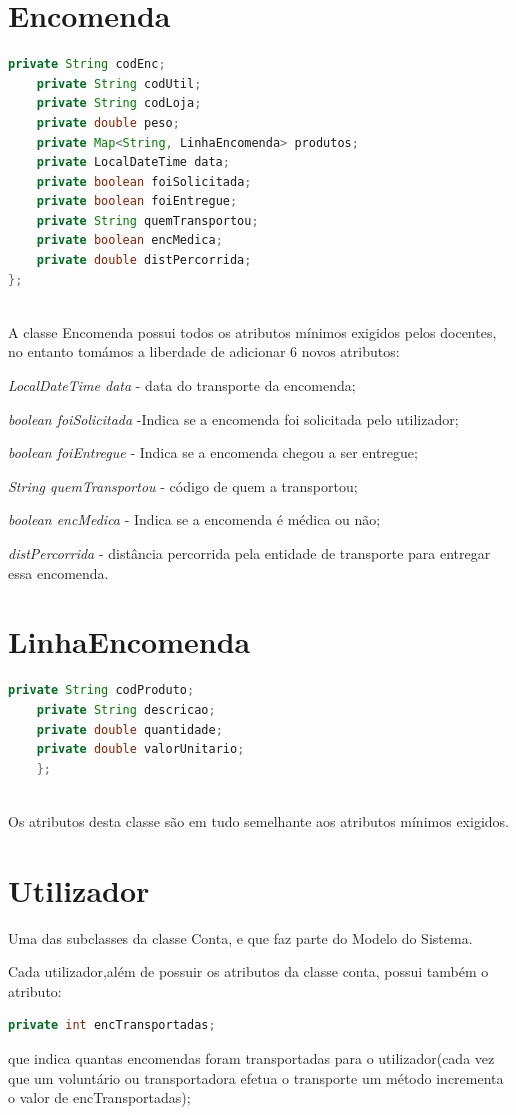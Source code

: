 \documentclass[a4paper]{report}
\begin{document}
	
	
	\section{Encomenda}
	\begin{lstlisting}[language=Java]
	private String codEnc;
	private String codUtil;
	private String codLoja;
	private double peso;
	private Map<String, LinhaEncomenda> produtos;
	private LocalDateTime data;
	private boolean foiSolicitada;
	private boolean foiEntregue;
	private String quemTransportou;
	private boolean encMedica;
	private double distPercorrida;
};
   
	\end{lstlisting}
	A classe Encomenda possui todos os atributos mínimos exigidos pelos docentes, no entanto tomámos a liberdade de adicionar 6 novos atributos:
	
	  \textit{LocalDateTime data} - data do transporte da encomenda;
	  	
	  \textit{boolean foiSolicitada} -Indica se a encomenda foi solicitada pelo utilizador;
	  
	  \textit{boolean foiEntregue}  - Indica se a encomenda chegou a ser entregue;
	  
	  \textit{String quemTransportou} - código de quem a transportou;
	  
	  \textit{boolean encMedica} - Indica se a encomenda é médica ou não;
	  
	  \textit{distPercorrida} - distância percorrida pela entidade de transporte para entregar essa encomenda.
	  
	
		\section{LinhaEncomenda}
	\begin{lstlisting}[language=Java]
	private String codProduto;
	private String descricao;
	private double quantidade;
	private double valorUnitario;
	};
	
	\end{lstlisting}
		Os atributos desta classe são em tudo semelhante aos atributos mínimos exigidos.
		
	\section{Utilizador}
	Uma das subclasses da classe Conta, e que faz parte do Modelo do Sistema.	
	
	Cada utilizador,além de possuir os atributos da classe conta, possui também o atributo:
	\begin{lstlisting}[language=Java]
	private int encTransportadas;
	\end{lstlisting}
	que indica quantas encomendas foram transportadas para o utilizador(cada vez que um voluntário ou transportadora efetua o transporte um método incrementa o valor de encTransportadas);
	
\end{document}
